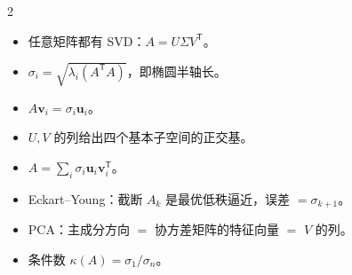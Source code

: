 \documentclass[11pt,a4paper,openany]{ctexbook}
\begin{document}
\begin{chapkeys}
\small
\begin{multicols}{2}
\begin{itemize}[leftmargin=1.5em, itemsep=2pt]
\item 任意矩阵都有 SVD：$A=U\Sigma V^{\mathsf T}$。
\item $\sigma_i=\sqrt{\lambda_i(A^{\mathsf T}A)}$，即椭圆半轴长。
\item $A\boldsymbol{v}_i=\sigma_i\boldsymbol{u}_i$。
\item $U,V$ 的列给出四个基本子空间的正交基。
\item $A=\sum_i\sigma_i\boldsymbol{u}_i\boldsymbol{v}_i^{\mathsf T}$。
\item Eckart--Young：截断 $A_k$ 是最优低秩逼近，误差 $=\sigma_{k+1}$。
\item PCA：主成分方向 $=$ 协方差矩阵的特征向量 $=$ $V$ 的列。
\item 条件数 $\kappa(A)=\sigma_1/\sigma_n$。
\end{itemize}
\end{multicols}
\end{chapkeys}
\end{document}

